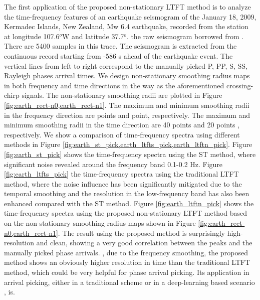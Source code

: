 The first application of the proposed non-stationary LTFT method is to analyze the time-frequency features of an earthquake seismogram of the January 18, 2009, Kermadec Islands, New Zealand, Mw 6.4 earthquake, recorded from the station  at longitude 107.6$^o$W and latitude 37.7$^o$.  the raw seismogram borrowed from \cite{yangkang2019nc}. There are 5400 samples in this trace. The seismogram is extracted from the continuous record starting from -586 s ahead of the earthquake event. The vertical lines from left to right correspond to the manually picked P, PP, S, SS, Rayleigh phases arrival times. 
We design non-stationary smoothing radius maps in both frequency and time directions in the  way as the aforementioned crossing-chirp signals. The  non-stationary smoothing radii are plotted in Figure \ref{fig:earth_rect-n0,earth_rect-n1}.  The maximum and minimum smoothing radii in the frequency direction are  points and  point, respectively. The maximum and minimum smoothing radii in the time direction are 40 points and 20 points , respectively. We show a comparison of time-frequency spectra using different methods in Figure \ref{fig:earth_st_pick,earth_ltfts_pick,earth_ltftn_pick}. Figure \ref{fig:earth_st_pick} shows the time-frequency spectra using the ST method, where significant noise  revealed around the frequency band 0.1-0.2 Hz. Figure \ref{fig:earth_ltfts_pick}  the time-frequency spectra using the traditional LTFT method, where the noise influence has been significantly mitigated due to the temporal smoothing and the resolution in the low-frequency band has also been enhanced compared with the ST method. Figure \ref{fig:earth_ltftn_pick} shows the time-frequency spectra using the proposed non-stationary LTFT method based on the non-stationary smoothing radius maps shown in Figure \ref{fig:earth_rect-n0,earth_rect-n1}. The result using the proposed method is surprisingly high-resolution and clean, showing a very good correlation between the  peaks and the manually picked phase arrivals. , due to the frequency smoothing, the proposed method shows an obviously higher resolution in time than the traditional LTFT method, which could be very helpful for phase arrival picking. Its application in arrival picking, either in a traditional scheme \cite[]{mostafa2016geo} or in a deep-learning based scenario \cite[]{chen2019ess,guoyin2020geo}, is.



